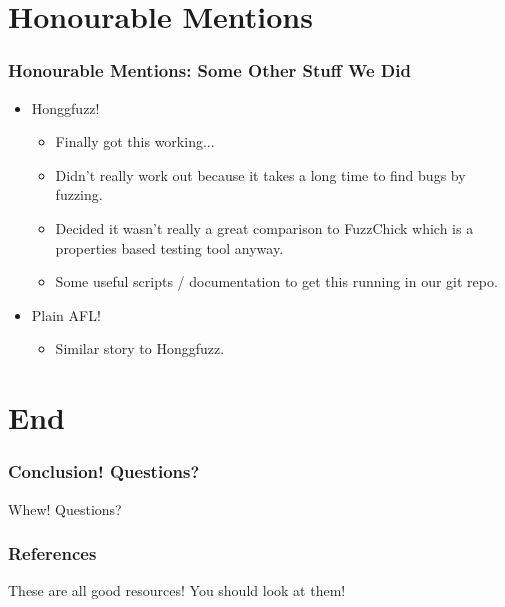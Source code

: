 \documentclass{beamer}
\begin{document}
\section{Honourable Mentions}

\begin{frame}
  \frametitle{Honourable Mentions: Some Other Stuff We Did}

  \begin{itemize}
    \pause
  \item Honggfuzz!
    \pause
    \begin{itemize}
    \item Finally got this working...
    \item Didn't really work out because it takes a long time to find
      bugs by fuzzing.
    \item Decided it wasn't really a great comparison to FuzzChick
      which is a properties based testing tool anyway.
    \item Some useful scripts / documentation to get this running in
      our git repo. \cite{quick700}
    \end{itemize}
    \pause
  \item Plain AFL!
    \pause
    \begin{itemize}
    \item Similar story to Honggfuzz.
    \end{itemize}
  \end{itemize}
\end{frame}

\section{End}

\begin{frame}
  \frametitle{Conclusion! Questions?}

  \huge{Whew! Questions?}
\end{frame}

\begin{frame}
  \frametitle{References}

  \nocite{*}
  \printbibliography

  These are all good resources! You should look at them!
\end{frame}
\end{document}
